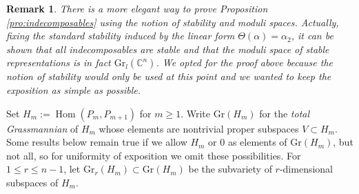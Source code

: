 \documentclass{amsart}
\newtheorem{remark}[theorem]{Remark}
\numberwithin{equation}{section}
\newcommand{\Gr}{\mathrm{Gr}}
\newcommand{\CC}{\mathbb{C}}
\newcommand{\Hom}{\operatorname{Hom}}
\begin{document}
\begin{remark}
  There is a more elegant way to prove Proposition \ref{pro:indecomposables} using the notion of stability and moduli spaces.
  Actually, fixing the standard stability induced by the linear form $\Theta(\alpha)=\alpha_2$, it can be shown that all indecomposables are stable and that the moduli space of stable representations is in fact $\Gr_l(\CC^n)$.
  We opted for the proof above because the notion of stability would only be used at this point and we wanted to keep the exposition as simple as possible. 
\end{remark}

Set $H_m:=\Hom(P_m,P_{m+1})$ for $m\ge1$.
Write $\Gr(H_m)$ for the \emph{total Grassmannian} of $H_m$ whose elements are nontrivial proper subspaces $V\subset H_m$.
Some results below remain true if we allow $H_m$ or $0$ as elements of $\Gr(H_m)$, but not all, so for uniformity of exposition we omit these possibilities.
For $1\le r\le n-1$, let $\Gr_r(H_m)\subset \Gr(H_m)$ be the subvariety of $r$-dimensional subspaces of $H_m$.
\end{document}
